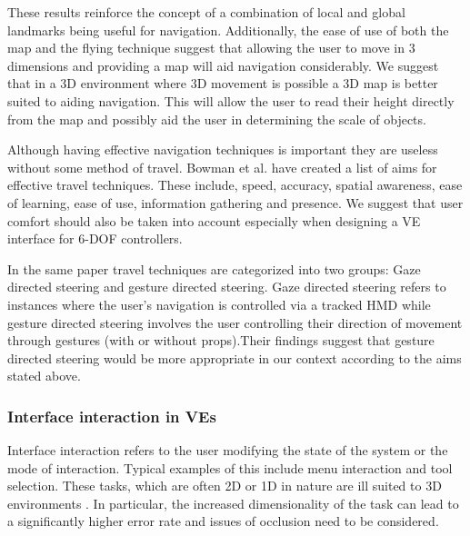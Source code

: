 \documentclass{sig-alternate-05-2015}
\begin{document}
These results reinforce the concept of a combination of local and global landmarks being useful for navigation\cite{Darken1993}. Additionally, the ease of use of both the map and the flying technique suggest that allowing the user to move in 3 dimensions and providing a map will aid navigation considerably. We suggest that in a 3D environment where 3D movement is possible a 3D map is better suited to aiding navigation. This will allow the user to read their height directly from the map and possibly aid the user in determining the scale of objects.

Although having effective navigation techniques is important they are useless without some method of travel. Bowman et al. have created a list of aims for effective travel techniques.\cite{Bowman1997} These include, speed, accuracy, spatial awareness, ease of learning, ease of use, information gathering and presence. We suggest that user comfort should also be taken into account especially when designing a VE interface for 6-DOF controllers.

 In the same paper travel techniques are categorized into two groups: Gaze directed steering and gesture directed steering\cite{Bowman1997}. Gaze directed steering refers to instances where the user's navigation is controlled via a tracked HMD while gesture directed  steering involves the user controlling their direction of movement through gestures (with or without props).Their findings suggest that gesture directed steering would be more appropriate in our context according to the aims stated above.
 


\subsubsection{Interface interaction in VEs}
 Interface interaction refers to the user modifying the state of the system or the mode of interaction\cite{Bowman2001}. Typical examples of this include menu interaction and tool selection. These tasks, which are often 2D or 1D in nature are ill suited to 3D environments \cite{Bowman2001, Hand1997}. In particular, the increased dimensionality of the task can lead to a significantly higher error rate and issues of occlusion need to be considered\cite{Hand1997}.
 
\end{document}
